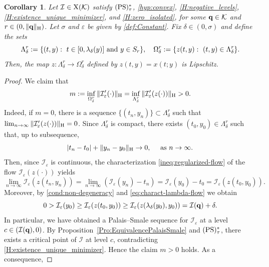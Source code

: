 \documentclass{article}
\newcommand{\boK}{\mathcal{K}}
\newcommand{\boI}{\mathcal{I}}
\newcommand{\Hilb}{{\textnormal H}}
\newcommand{\minq}{{\bf q}}
\newcommand{\X}{{\textnormal X}}
\newcommand{\PS}{(\textnormal{PS})^{*}_\tau}
\newtheorem{corollary}{Corollary}[section]
\theoremstyle{definition}
\begin{document}
\begin{corollary}\label{cor:continuity}
Let $\boI\in\X(\boK)$ satisfy $\PS$, \eqref{hyp:convex}, \eqref{H:negative_levels}, \eqref{H:existence_unique_minimizer}, and \eqref{H:zero_isolated}, for some $\minq\in\boK$ and $r\in(0,\|\minq\|_\Hilb)$. Let $\sigma$ and $\varepsilon$ be given by \eqref{def:Constant}. Fix $\delta\in(0,\sigma)$ and define the sets 
\begin{equation}\label{def:LambdaSet}
    \Lambda^r_\delta:=\{(t,y):\  t\in[0,\lambda_\delta(y)]\hbox{ and } y\in S_r\},\quad\Omega^r_\delta:=\{z(t,y):\ (t,y)\in\Lambda^r_\delta\}.
\end{equation} Then, the map $z:\Lambda^r_\delta\to\Omega^r_\delta$ defined by $z(t,y)=x(t;y)$ is Lipschitz. 
\end{corollary}
\begin{proof}
We claim that
\begin{equation}
m:=\inf_{\Omega^r_\delta}\|\boI'_\varepsilon(\cdot)\|_\Hilb=\inf_{\Lambda_\delta^r}\|\boI'_\varepsilon(z(\cdot))\|_\Hilb>0.
\end{equation} 
Indeed, if $m=0$, there is a sequence $\{(t_n,y_n)\}\subset\Lambda_\delta^r$ such that $\lim_{n\to\infty}\|\boI_\varepsilon'(z(\cdot))\|_\Hilb=0$. Since $\Lambda_\delta^r$ is compact, there exists $(t_0,y_0)\in\Lambda_\delta^r$ such that, up to subsequence, 
\begin{equation}
    |t_n-t_0|+\|y_n-y_0\|_\Hilb\to0,\quad\hbox{ as }n\to\infty.
\end{equation}
Then, since $\boI_\varepsilon$ is continuous, the characterization \eqref{ineq:regularized-flow} of the flow $\boI_\varepsilon(z(\cdot))$ yields
\begin{equation}
    \lim_{n\to\infty}\boI_\varepsilon(z(t_n,y_n))=\lim_{n\to\infty}(\boI_\varepsilon(y_n)-t_n)=\boI_\varepsilon(y_0)-t_0=\boI_\varepsilon(z(t_0,y_0)).
\end{equation}
Moreover, by \eqref{cond:non-degeneracy} and \eqref{eq:charact-lambda-flow} we obtain
\begin{equation}
    0>\boI_\varepsilon(y_0)\geq\boI_\varepsilon(z(t_0,y_0))\geq\boI_\varepsilon(z(\lambda_\delta(y_0),y_0))=\boI(\minq)+\delta.
\end{equation}
In particular, we have obtained a Palais--Smale sequence for $\boI_\varepsilon$ at a level $c\in(\boI(\minq),0)$. By Proposition~\ref{Pro:EquivalencePalaisSmale} and $\PS$,  there exists a critical point of $\boI$ at level $c$, contradicting \eqref{H:existence_unique_minimizer}. Hence the claim $m>0$ holds. As a consequence,

\end{proof}
\end{document}
